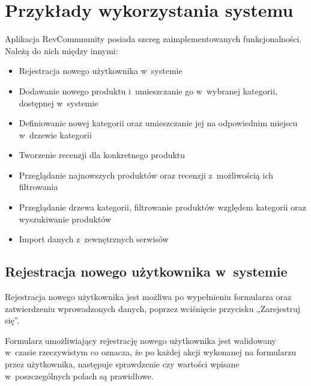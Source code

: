 \chapter{Przykłady wykorzystania systemu}

Aplikacja RevCommnunity posiada szereg zaimplementowanych funkcjonalności. Należą do nich między innymi:

\begin{itemize}
\item Rejestracja nowego użytkownika w~systemie
\item Dodawanie nowego produktu i~umieszczanie go w~wybranej kategorii, dostępnej w~systemie
\item Definiowanie nowej kategorii oraz umieszczanie jej na odpowiednim miejscu w~drzewie kategorii
\item Tworzenie recenzji dla konkretnego produktu
\item Przeglądanie najnowszych produktów oraz recenzji z~możliwością ich filtrowania
\item Przeglądanie drzewa kategorii, filtrowanie produktów względem kategorii oraz wyszukiwanie produktów
\item Import danych z~zewnętrznych serwisów
\end{itemize}

\section{Rejestracja nowego użytkownika w~systemie}

Rejestracja nowego użytkownika jest możliwa po wypełnieniu formularza oraz zatwierdzeniu wprowadzonych danych, poprzez wciśnięcie przycisku „Zarejestruj się”.

Formularz umożliwiający rejestrację nowego użytkownika jest walidowany w~czasie rzeczywistym co oznacza, że po każdej akcji wykonanej na formularzu przez użytkownika, następuje sprawdzenie czy wartości wpisane w~poszczególnych polach są prawidłowe.

